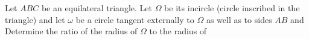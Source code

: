 Let $ ABC$ be an equilateral triangle. Let $ \Omega$ be its incircle (circle inscribed in the triangle) and let $ \omega$ be a circle tangent externally to $ \Omega$ as well as to sides $ AB$ and  Determine the ratio of the radius of $ \Omega$ to the radius of 